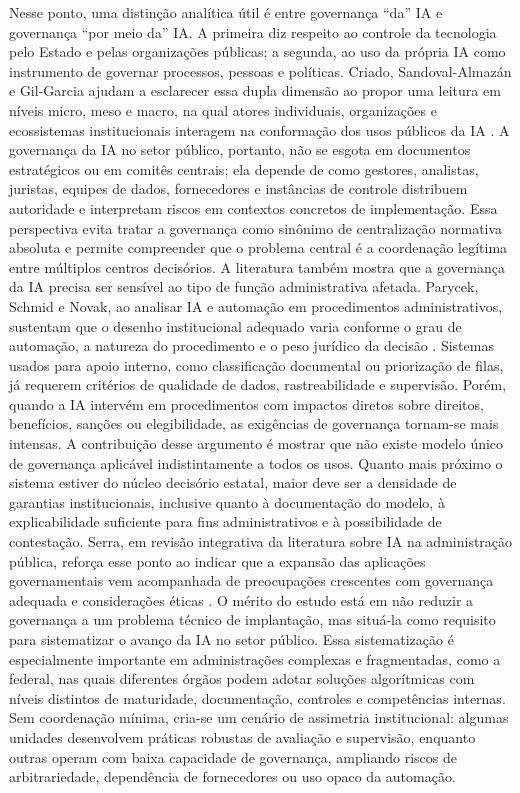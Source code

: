 \documentclass[12pt,a4paper]{article}
\begin{document}
Nesse ponto, uma distinção analítica útil é entre governança “da” IA e governança “por meio da” IA. A primeira diz respeito ao controle da tecnologia pelo Estado e pelas organizações públicas; a segunda, ao uso da própria IA como instrumento de governar processos, pessoas e políticas. Criado, Sandoval-Almazán e Gil-Garcia ajudam a esclarecer essa dupla dimensão ao propor uma leitura em níveis micro, meso e macro, na qual atores individuais, organizações e ecossistemas institucionais interagem na conformação dos usos públicos da IA \autocite{criado2024artificial}. A governança da IA no setor público, portanto, não se esgota em documentos estratégicos ou em comitês centrais; ela depende de como gestores, analistas, juristas, equipes de dados, fornecedores e instâncias de controle distribuem autoridade e interpretam riscos em contextos concretos de implementação. Essa perspectiva evita tratar a governança como sinônimo de centralização normativa absoluta e permite compreender que o problema central é a coordenação legítima entre múltiplos centros decisórios.
A literatura também mostra que a governança da IA precisa ser sensível ao tipo de função administrativa afetada. Parycek, Schmid e Novak, ao analisar IA e automação em procedimentos administrativos, sustentam que o desenho institucional adequado varia conforme o grau de automação, a natureza do procedimento e o peso jurídico da decisão \autocite{parycek2023artificial}. Sistemas usados para apoio interno, como classificação documental ou priorização de filas, já requerem critérios de qualidade de dados, rastreabilidade e supervisão. Porém, quando a IA intervém em procedimentos com impactos diretos sobre direitos, benefícios, sanções ou elegibilidade, as exigências de governança tornam-se mais intensas. A contribuição desse argumento é mostrar que não existe modelo único de governança aplicável indistintamente a todos os usos. Quanto mais próximo o sistema estiver do núcleo decisório estatal, maior deve ser a densidade de garantias institucionais, inclusive quanto à documentação do modelo, à explicabilidade suficiente para fins administrativos e à possibilidade de contestação.
Serra, em revisão integrativa da literatura sobre IA na administração pública, reforça esse ponto ao indicar que a expansão das aplicações governamentais vem acompanhada de preocupações crescentes com governança adequada e considerações éticas \autocite{serra2024a}. O mérito do estudo está em não reduzir a governança a um problema técnico de implantação, mas situá-la como requisito para sistematizar o avanço da IA no setor público. Essa sistematização é especialmente importante em administrações complexas e fragmentadas, como a federal, nas quais diferentes órgãos podem adotar soluções algorítmicas com níveis distintos de maturidade, documentação, controles e competências internas. Sem coordenação mínima, cria-se um cenário de assimetria institucional: algumas unidades desenvolvem práticas robustas de avaliação e supervisão, enquanto outras operam com baixa capacidade de governança, ampliando riscos de arbitrariedade, dependência de fornecedores ou uso opaco da automação.
\end{document}
